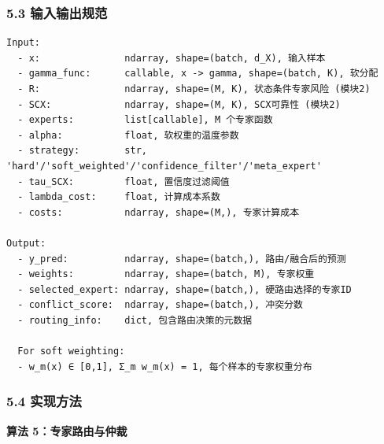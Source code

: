 \documentclass[
  12pt,
]{ctexart}
\begin{document}
\subsubsection{5.3
输入输出规范}\label{ux8f93ux5165ux8f93ux51faux89c4ux8303-4}

\begin{verbatim}
Input:
  - x:               ndarray, shape=(batch, d_X), 输入样本
  - gamma_func:      callable, x -> gamma, shape=(batch, K), 软分配
  - R:               ndarray, shape=(M, K), 状态条件专家风险 (模块2)
  - SCX:             ndarray, shape=(M, K), SCX可靠性 (模块2)
  - experts:         list[callable], M 个专家函数
  - alpha:           float, 软权重的温度参数
  - strategy:        str, 'hard'/'soft_weighted'/'confidence_filter'/'meta_expert'
  - tau_SCX:         float, 置信度过滤阈值
  - lambda_cost:     float, 计算成本系数
  - costs:           ndarray, shape=(M,), 专家计算成本

Output:
  - y_pred:          ndarray, shape=(batch,), 路由/融合后的预测
  - weights:         ndarray, shape=(batch, M), 专家权重
  - selected_expert: ndarray, shape=(batch,), 硬路由选择的专家ID
  - conflict_score:  ndarray, shape=(batch,), 冲突分数
  - routing_info:    dict, 包含路由决策的元数据

  For soft weighting:
  - w_m(x) ∈ [0,1], Σ_m w_m(x) = 1, 每个样本的专家权重分布
\end{verbatim}

\subsubsection{5.4 实现方法}\label{ux5b9eux73b0ux65b9ux6cd5-4}

\textbf{算法 5：专家路由与仲裁}
\end{document}
